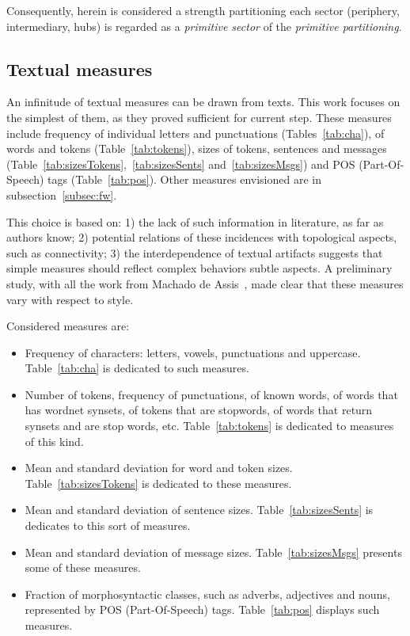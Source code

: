 \documentclass[%
 aip,
 jmp,%
 amsmath,amssymb,
 reprint,%
]{revtex4-1}
\begin{document}
Consequently, herein is considered a strength partitioning each sector (periphery, intermediary, hubs) is regarded as a \emph{primitive sector} of the \emph{primitive partitioning}.



\subsection{Textual measures}
An infinitude of textual measures can be drawn from texts. This work focuses on the simplest of them, as they proved sufficient for current step. These measures include frequency of individual letters and punctuations (Tables~\ref{tab:cha}), of words and tokens (Table~\ref{tab:tokens}), sizes of tokens, sentences and messages (Table~\ref{tab:sizesTokens},~\ref{tab:sizesSents} and~\ref{tab:sizesMsgs}) and POS (Part-Of-Speech) tags (Table~\ref{tab:pos}). Other measures envisioned are in subsection~\ref{subsec:fw}.

This choice is based on: 1) the lack of such information in literature, as far as authors know; 
2) potential relations of these incidences with topological aspects, such as connectivity; 3) the interdependence of textual artifacts suggests that simple measures should reflect complex behaviors subtle aspects.
A preliminary study, with all the work from Machado de Assis~\cite{letrasMachado}, made clear that these measures vary with respect to style.


Considered measures are:
\begin{itemize}
    \item Frequency of characters: letters, vowels, punctuations and uppercase. Table~\ref{tab:cha} is dedicated to such measures.
    \item Number of tokens, frequency of punctuations, of known words, of words that has wordnet synsets, of tokens that are stopwords, of words that return synsets and are stop words, etc. Table~\ref{tab:tokens} is dedicated to measures of this kind.
    \item Mean and standard deviation for word and token sizes. Table~\ref{tab:sizesTokens} is dedicated to these measures.
    \item Mean and standard deviation of sentence sizes. Table~\ref{tab:sizesSents} is dedicates to this sort of measures.
    \item Mean and standard deviation of message sizes. Table~\ref{tab:sizesMsgs} presents some of these measures.
    \item Fraction of morphosyntactic classes, such as adverbs, adjectives and nouns, represented by POS (Part-Of-Speech) tags. Table~\ref{tab:pos} displays such measures.
\end{itemize}
\end{document}
